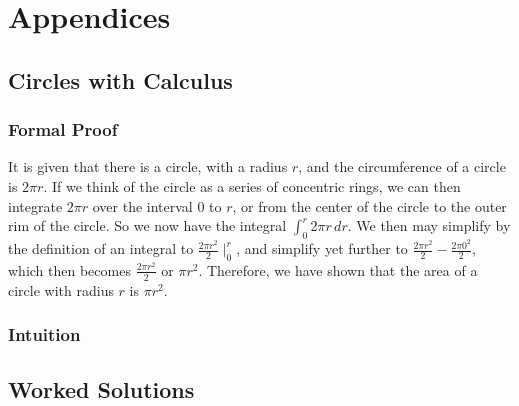 \documentclass{book}
\begin{document}
\part{Appendices}
\begin{appendices}
\chapter{Circles with Calculus}
\section*{Formal Proof}
It is given that there is a circle, with a radius $r$, and the circumference of a circle is $2\pi r$. If we think of the circle as a series of concentric rings, we can then integrate $2\pi r$ over the interval $0$ to $r$, or from the center of the circle to the outer rim of the circle. So we now have the integral $\int^r_0 2\pi r\, dr$. We then may simplify by the definition of an integral to $\frac{2\pi r^2}{2}\mid^r_0$, and simplify yet further to $\frac{2\pi r^2}{2}-\frac{2\pi 0^2}{2}$, which then becomes $\frac{2\pi r^2}{2}$ or $\pi r^2$. Therefore, we have shown that the area of a circle with radius $r$ is $\pi r^2$.
\section*{Intuition}

\chapter{Worked Solutions}


\end{appendices}
\end{document}
